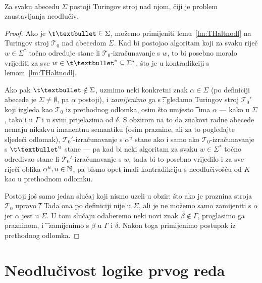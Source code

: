 \begin{propozicija}\ \\
Za svaku abecedu $\Sigma$ postoji Turingov stroj nad njom, čiji je problem zaustavljanja neodlučiv\!.
\end{propozicija}
\begin{proof}
Ako je $\t\textbullet\;\raisebox{1.1pt}{$\in$}\;\Sigma$, možemo primijeniti lemu~\ref{lm:THaltnodl} na Turingov stroj $\mathcal T_0$ nad abecedom $\Sigma$. Kad bi postojao algoritam koji za svaku riječ $w\in\Sigma^*$ točno određuje stane li $\mathcal T_0$-izračunavanje s $w$, to bi posebno moralo vrijediti za sve $w\in\t\textbullet^*\subseteq\Sigma^*$, što je u kontradikciji s lemom~\ref{lm:THaltnodl}.

Ako pak $\t\textbullet\notin\Sigma$, uzmimo neki konkretni znak $\alpha\in\Sigma$ (po definiciji abecede je $\Sigma\ne\emptyset$, pa $\alpha$ postoji), i \emph{zamijenimo} ga s \t\textbullet: gledamo Turingov stroj $\mathcal T_0'$ koji izgleda kao $\mathcal T_0$ iz prethodnog odlomka, osim što umjesto \t\textbullet\ ima $\alpha$ --- kako u $\Sigma$, tako i u $\Gamma$ i u svim prijelazima od $\delta$. S obzirom na to da znakovi radne abecede nemaju nikakvu imanentnu semantiku (osim praznine, ali za to pogledajte sljedeći odlomak), $\mathcal T_0'$-izračunavanje s $\alpha^u$ stane ako i samo ako $\mathcal T_0$-izračunavanje s $\t\textbullet^u$ stane --- pa kad bi neki algoritam za svaku $w\in\Sigma^*$ točno određivao stane li $\mathcal T_0'$-izračunavanje s $w$, tada bi to posebno vrijedilo i za sve riječi oblika $\alpha^u,u\in{\mathbb N}$, pa bismo opet imali kontradikciju s neodlučivošću od $K$ kao u prethodnom odlomku.

Postoji još samo jedan slučaj koji nismo uzeli u obzir: što ako je praznina stroja $\mathcal T_0$ upravo~\t\textbullet? Tada ona po definiciji nije u $\Sigma$, ali je ne možemo samo zamijeniti s $\alpha$ jer $\alpha$ jest u $\Sigma$. U tom slučaju odaberemo neki novi znak $\beta\notin\Gamma$, proglasimo ga prazninom, i \t\textbullet\ zamijenimo s $\beta$ u $\Gamma$ i $\delta$. Nakon toga primijenimo postupak iz prethodnog odlomka.
\end{proof}

\section{Neodlučivost logike prvog reda}

